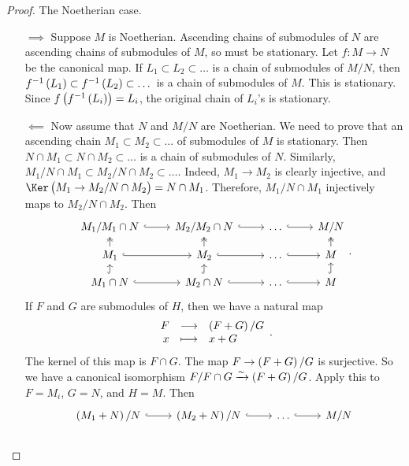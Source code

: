 \begin{proof}
The Noetherian case.
\begin{itemize}
\item[$ \implies $] Suppose $ M $ is Noetherian. Ascending chains of submodules of $ N $ are ascending chains of submodules of $ M $, so must be stationary. Let $ f : M \to N $ be the canonical map. If $ L_1 \subset L_2 \subset \dots $ is a chain of submodules of $ M / N $, then $ f^{-1}\br{L_1} \subset f^{-1}\br{L_2} \subset \dots $ is a chain of submodules of $ M $. This is stationary. Since $ f\br{f^{-1}\br{L_i}} = L_i $, the original chain of $ L_i $'s is stationary.

\pagebreak


\item[$ \impliedby $] Now assume that $ N $ and $ M / N $ are Noetherian. We need to prove that an ascending chain $ M_1 \subset M_2 \subset \dots $ of submodules of $ M $ is stationary. Then $ N \cap M_1 \subset N \cap M_2 \subset \dots $ is a chain of submodules of $ N $. Similarly, $ M_1 / N \cap M_1 \subset M_2 / N \cap M_2 \subset \dots $. Indeed, $ M_1 \to M_2 $ is clearly injective, and $ \Ker \br{M_1 \to M_2 / N \cap M_2} = N \cap M_1 $. Therefore, $ M_1 / N \cap M_1 $ injectively maps to $ M_2 / N \cap M_2 $. Then
$$
\begin{tikzcd}[row sep=small]
M_1 / M_1 \cap N \arrow[hookrightarrow]{r} & M_2 / M_2 \cap N \arrow[hookrightarrow]{r} & \dots \arrow[hookrightarrow]{r} & M / N \\
M_1 \arrow[twoheadrightarrow]{u} \arrow[hookrightarrow]{r} & M_2 \arrow[twoheadrightarrow]{u} \arrow[hookrightarrow]{r} & \dots \arrow[hookrightarrow]{r} & M \arrow[twoheadrightarrow]{u} \\
M_1 \cap N \arrow[hookrightarrow]{u} \arrow[hookrightarrow]{r} & M_2 \cap N \arrow[hookrightarrow]{u} \arrow[hookrightarrow]{r} & \dots \arrow[hookrightarrow]{r} & M \arrow[hookrightarrow]{u}
\end{tikzcd}.
$$
If $ F $ and $ G $ are submodules of $ H $, then we have a natural map
$$ \function{F}{\br{F + G} / G}{x}{x + G}. $$
The kernel of this map is $ F \cap G $. The map $ F \to \br{F + G} / G $ is surjective. So we have a canonical isomorphism $ F / F \cap G \xrightarrow{\sim} \br{F + G} / G $. Apply this to $ F = M_i $, $ G = N $, and $ H = M $. Then
$$
\begin{tikzcd}[row sep=small]
\br{M_1 + N} / N \arrow[hookrightarrow]{r} & \br{M_2 + N} / N \arrow[hookrightarrow]{r} & \dots \arrow[hookrightarrow]{r} & M / N \\

\end{tikzcd}$$
\end{itemize}
\end{proof}
